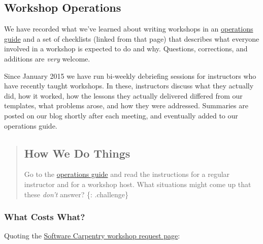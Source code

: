 \subsection{Workshop Operations}\label{workshop-operations}

We have recorded what we've learned about writing workshops in an
\href{\{\{\%20site.swc\_site\%20\}\}/workshops/operations/}{operations
guide} and a set of checklists (linked from that page) that describes
what everyone involved in a workshop is expected to do and why.
Questions, corrections, and additions are \emph{very} welcome.

Since January 2015 we have run bi-weekly debriefing sessions for
instructors who have recently taught workshops. In these, instructors
discuss what they actually did, how it worked, how the lessons they
actually delivered differed from our templates, what problems arose, and
how they were addressed. Summaries are posted on our blog shortly after
each meeting, and eventually added to our operations guide.

\begin{quote}
\subsection{How We Do Things}\label{how-we-do-things}

Go to the
\href{\{\{\%20site.swc\_site\%20\}\}/workshops/operations/}{operations
guide} and read the instructions for a regular instructor and for a
workshop host. What situations might come up that these \emph{don't}
answer? \{: .challenge\}
\end{quote}

\subsubsection{What Costs What?}\label{what-costs-what}

Quoting the \href{\{\{\%20site.swc\_site\}\}/workshops/request/}{Software
Carpentry workshop request page}:

